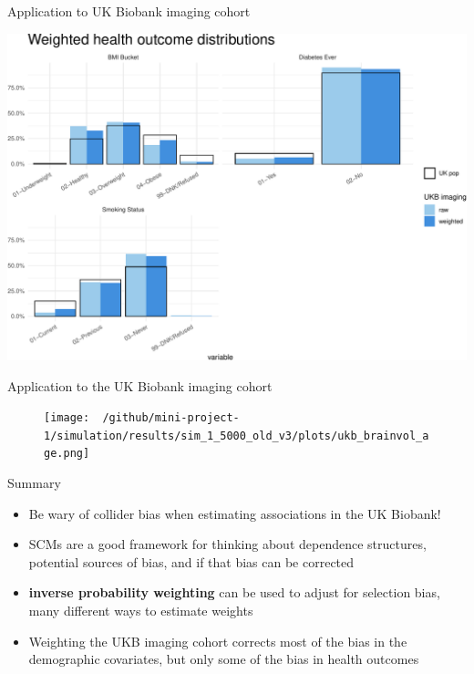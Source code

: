 \documentclass[
  ignorenonframetext,
]{beamer}
\begin{document}
\begin{frame}{Application to UK Biobank imaging cohort}
\protect\hypertarget{application-to-uk-biobank-imaging-cohort-1}{}

\includegraphics{fmrib-deck-20191002_files/figure-beamer/fig-ukb-results-health-1.pdf}

\end{frame}

\begin{frame}{Application to the UK Biobank imaging cohort}
\protect\hypertarget{application-to-the-uk-biobank-imaging-cohort}{}

\begin{figure}
\centering
\texttt{[image: ~/github/mini-project-1/simulation/results/sim\_1\_5000\_old\_v3/plots/ukb\_brainvol\_age.png]}
\end{figure}

\end{frame}

\begin{frame}{Summary}
\protect\hypertarget{summary}{}

\begin{itemize}
\item
  Be wary of collider bias when estimating associations in the UK
  Biobank!
\item
  SCMs are a good framework for thinking about dependence structures,
  potential sources of bias, and if that bias can be corrected
\item
  \textbf{inverse probability weighting} can be used to adjust for
  selection bias, many different ways to estimate weights
\item
  Weighting the UKB imaging cohort corrects most of the bias in the
  demographic covariates, but only some of the bias in health outcomes
\end{itemize}

\end{frame}
\end{document}
